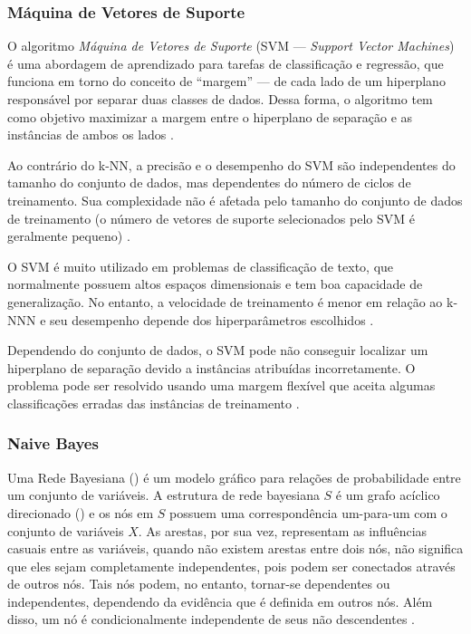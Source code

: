 \documentclass[
	12pt,				%
	oneside,			%
	a4paper,			%
	english,			%
	brazil				%
	]{abntex2ppgsi}
\begin{document}
{\subsubsection{Máquina de Vetores de Suporte}

O algoritmo \textit{Máquina de Vetores de Suporte} (SVM --- \textit{Support Vector Machines}) é uma abordagem de aprendizado para tarefas de classificação e regressão, que funciona em torno do conceito de ``margem'' --- de cada lado de um hiperplano responsável por separar duas classes de dados. Dessa forma, o algoritmo tem como objetivo maximizar a margem entre o hiperplano de separação e as instâncias de ambos os lados \cite{kotsiantis2006machine, singh2016review}. 

Ao contrário do k-NN, a precisão e o desempenho do SVM são independentes do tamanho do conjunto de dados, mas dependentes do número de ciclos de treinamento. Sua complexidade não é afetada pelo tamanho do conjunto de dados de treinamento (o número de vetores de suporte selecionados pelo SVM é geralmente pequeno) \cite{kotsiantis2006machine, singh2016review}.

O SVM é muito utilizado em problemas de classificação de texto, que normalmente possuem altos espaços dimensionais e tem boa capacidade de generalização. No entanto, a velocidade de treinamento é menor em relação ao k-NNN e seu desempenho depende dos hiperparâmetros escolhidos \cite{kotsiantis2006machine, singh2016review}.

Dependendo do conjunto de dados, o SVM pode não conseguir localizar um hiperplano de separação devido a instâncias atribuídas incorretamente. O problema pode ser resolvido usando uma margem flexível que aceita algumas classificações erradas das instâncias de treinamento \cite{kotsiantis2006machine}.

\subsubsection{Naive Bayes}

Uma Rede Bayesiana () é um modelo gráfico para relações de probabilidade entre um conjunto de variáveis. A estrutura de rede bayesiana $S$ é um grafo acíclico direcionado () e os nós em $S$ possuem uma correspondência um-para-um com o conjunto de variáveis $X$. As arestas, por sua vez, representam as influências casuais entre as variáveis,
 quando não existem arestas entre dois nós, não significa que eles sejam completamente independentes, pois podem ser conectados através de outros nós. Tais nós podem, no entanto, tornar-se dependentes ou independentes, dependendo da evidência que é definida em outros nós. Além disso, um nó é condicionalmente independente de seus não descendentes \cite{kotsiantis2006machine}.
 
}
\end{document}

